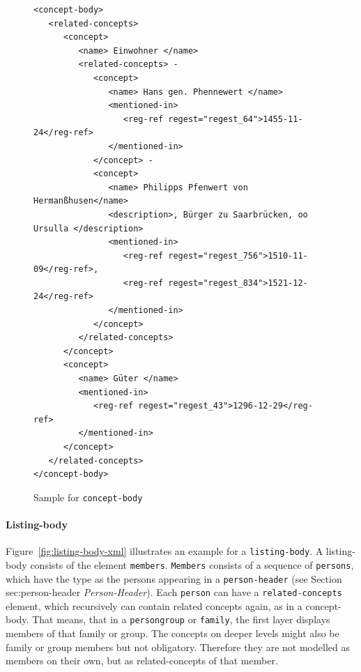 \begin{figure}[H]
\centering
\begin{verbatim}
<concept-body>
   <related-concepts>
      <concept>
         <name> Einwohner </name>
         <related-concepts> -
            <concept>
               <name> Hans gen. Phennewert </name>
               <mentioned-in>
                  <reg-ref regest="regest_64">1455-11-24</reg-ref>
               </mentioned-in>
            </concept> -
            <concept>
               <name> Philipps Pfenwert von Hermanßhusen</name>
               <description>, Bürger zu Saarbrücken, oo Ursulla </description>
               <mentioned-in>
                  <reg-ref regest="regest_756">1510-11-09</reg-ref>,
                  <reg-ref regest="regest_834">1521-12-24</reg-ref>
               </mentioned-in>
            </concept>
         </related-concepts>
      </concept>
      <concept>
         <name> Güter </name>
         <mentioned-in>
            <reg-ref regest="regest_43">1296-12-29</reg-ref>
         </mentioned-in>
      </concept>
   </related-concepts>
</concept-body>
\end{verbatim}
\caption{Sample for \texttt{concept-body}}
\label{fig:concept-body-xml}
\end{figure}

\paragraph{Listing-body}
Figure~\ref{fig:listing-body-xml} illustrates an example for a
\texttt{listing-body}. A listing-body consists of the element
\texttt{members}. \texttt{Members} consists of a sequence of
\texttt{persons}, which have the type as the persons appearing in a
\texttt{person-header} (see Section sec:person-header
\textit{Person-Header}). Each \texttt{person} can have a
\texttt{related-concepts} element, which recursively can contain
related concepts again, as in a concept-body. That means, that in a
\texttt{persongroup} or \texttt{family}, the first layer displays
members of that family or group. The concepts on deeper levels might
also be family or group members but not obligatory. Therefore they are
not modelled as members on their own, but as related-concepts of that
member.

